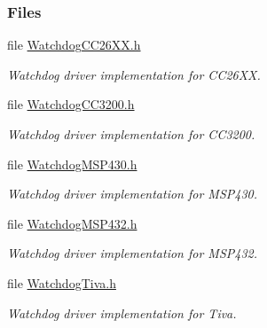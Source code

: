 \subsubsection*{Files}
\begin{DoxyCompactItemize}
\item 
file \hyperlink{_watchdog_c_c26_x_x_8h}{Watchdog\+C\+C26\+X\+X.\+h}
\begin{DoxyCompactList}\small\item\em Watchdog driver implementation for C\+C26\+X\+X. \end{DoxyCompactList}\item 
file \hyperlink{_watchdog_c_c3200_8h}{Watchdog\+C\+C3200.\+h}
\begin{DoxyCompactList}\small\item\em Watchdog driver implementation for C\+C3200. \end{DoxyCompactList}\item 
file \hyperlink{_watchdog_m_s_p430_8h}{Watchdog\+M\+S\+P430.\+h}
\begin{DoxyCompactList}\small\item\em Watchdog driver implementation for M\+S\+P430. \end{DoxyCompactList}\item 
file \hyperlink{_watchdog_m_s_p432_8h}{Watchdog\+M\+S\+P432.\+h}
\begin{DoxyCompactList}\small\item\em Watchdog driver implementation for M\+S\+P432. \end{DoxyCompactList}\item 
file \hyperlink{_watchdog_tiva_8h}{Watchdog\+Tiva.\+h}
\begin{DoxyCompactList}\small\item\em Watchdog driver implementation for Tiva. \end{DoxyCompactList}\end{DoxyCompactItemize}
